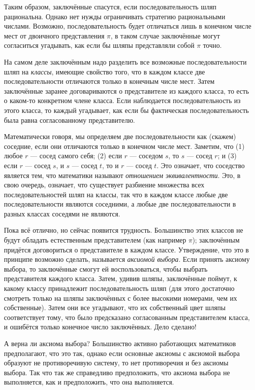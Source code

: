 Таким образом, заключённые спасутся, если последовательность шляп рациональна.
Однако нет нужды ограничивать стратегию рациональными числами.
Возможно, последовательность будет отличаться лишь в конечном числе мест от двоичного представления $\pi$, в таком случае заключённые могут согласиться угадывать, как если бы шляпы представляли собой $\pi$ точно.

На самом деле заключённым надо разделить все возможные последовательности шляп на \emph{классы}, имеющие свойство того, что в каждом классе две последовательности отличаются только в конечным числе мест.
Затем заключённые заранее договариваются о представителе из каждого класса, то есть о каком-то конкретном члене класса.
Если наблюдается последовательность из этого класса, то каждый угадывает, как если бы фактическая последовательность была равна согласованному представителю.

Математически говоря, мы определяем две последовательности как (скажем) соседние, если они отличаются только в конечном числе мест.
Заметим, что
(1) любое $r$ --- сосед самого себя;
(2) если $r$ --- соседом $s$, то $s$ --- сосед $r$; и
(3) если $r$ --- сосед $s$, и $s$ --- сосед $t$, то и $r$ --- сосед $t$.
Это означает, что соседство является тем, что математики называют \emph{отношением эквивалентности}.
Это, в свою очередь, означает, что существует разбиение множества всех последовательностей шляп на классы, так что в каждом классе любые две последовательности являются соседними, а любые две последовательности в разных классах соседями не являются.

Пока всё отлично, но сейчас появится трудность.
Большинство этих классов не будут обладать естественным представителем (как например $\pi$);
заключённым придётся договориться о представителе в каждом классе.
Утверждение, что это в принципе возможно сделать, называется \emph{аксиомой выбора}.
Если принять аксиому выбора, то заключённые смогут ей воспользоваться, чтобы выбрать представителя каждого класса.
Затем, удивив шляпы, заключённые поймут, к какому классу принадлежит последовательность шляп (для этого достаточно смотреть только на шляпы заключённых с более высокими номерами, чем их собственные).
Затем они все угадывают, что их собственный цвет шляпы соответствует тому, что было предсказано согласованным представителем класса, и ошибётся только конечное число заключённых.
Дело сделано!

А верна ли аксиома выбора?
Большинство активно работающих математиков предполагают, что это так, однако если основные аксиомы с аксиомой выбора образуют не противоречивую систему, то нет противоречия и без аксиомы выбора.
Так что так же справедливо предположить, что аксиома выбора не выполняется, как и предположить, что она выполняется.

